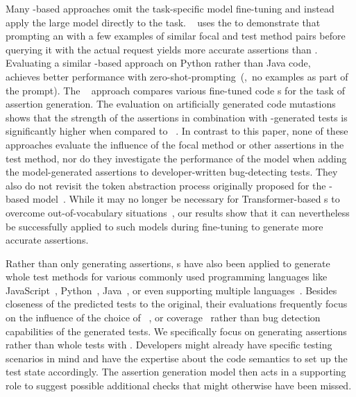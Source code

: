 Many \llm{}-based approaches omit the task-specific model fine-tuning
and instead apply the large model directly to the task.
~\cite{Nashid2023} uses the  \llm
to demonstrate that prompting an \llm with a few examples of similar
focal and test method pairs before querying it with the actual request
yields more accurate assertions than \atlas.
Evaluating a similar \llm{}-based approach on Python rather than Java
code, ~\cite{Wang2024} achieves better performance
with zero-shot-prompting~(\ie,~no examples as part of the prompt).
The \togll~\cite{Hossain2024} approach compares various fine-tuned
code \llm{}s for the task of assertion generation. The evaluation on
artificially generated code mutastions shows that the strength of the
assertions in combination with \evosuite-generated tests is
significantly higher when compared to \toga~\cite{Hossain2024}.
In contrast to this paper, none of these approaches evaluate the
influence of the focal method or other assertions in the test method,
nor do they investigate the performance of the model when adding the
model-generated assertions to developer-written bug-detecting tests.
They also do not revisit the token abstraction process originally
proposed for the -based \atlas
model~\cite{Watson2020}. While it may no longer be necessary for
Transformer-based \llm{}s to overcome out-of-vocabulary
situations~\cite{Karampatsis2020}, our results show that it can
nevertheless be successfully applied to such models during fine-tuning
to generate more accurate assertions.


Rather than only generating assertions, \llm{}s have also been applied
to generate whole test methods for various commonly used programming
languages like JavaScript~\cite{Schaefer2024}, Python~\cite{Ryan2024},
Java~\cite{Chen2024}, or even supporting multiple
languages~\cite{He2024a}.
Besides closeness of the predicted tests to the original, their
evaluations frequently focus on the influence of the choice of
\llm~\cite{Schaefer2024,Ryan2024}, or
coverage~\cite{Schaefer2024,Ryan2024,Chen2024} rather than bug
detection capabilities of the generated tests.
We specifically focus on generating assertions rather than whole tests
with \assertfive. Developers might already have specific testing
scenarios in mind and have the expertise about the code semantics to
set up the test state accordingly. The assertion generation model then
acts in a supporting role to suggest possible additional checks that
might otherwise have been missed.


